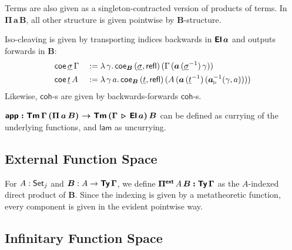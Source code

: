 \documentclass[sigplan,review,anonymous]{acmart}\settopmatter{printfolios=true,printccs=false,printacmref=false}
\newcommand{\ext}{\triangleright}
\newcommand{\Pii}{\Pi}
\newcommand{\appi}{\mathsf{app}}
\newcommand{\lami}{\mathsf{lam}}
\newcommand{\Pie}{\Pi^{\mathsf{ext}}}
\newcommand{\bTy}{\boldsymbol{\Ty}}
\newcommand{\bGamma}{\boldsymbol{\Gamma}}
\newcommand{\ba}{\boldsymbol{a}}
\newcommand{\bB}{\boldsymbol{B}}
\newcommand{\bEl}{\boldsymbol{\El}}
\newcommand{\bPii}{\boldsymbol{\Pi}}
\newcommand{\bPie}{\boldsymbol{\Pie}}
\newcommand{\ul}[1]{\underline{#1}}
\newcommand{\ulsigma}{\ul{\sigma}}
\newcommand{\ult}{\ul{t}}
\newcommand{\coe}{\mathsf{coe}}
\newcommand{\coh}{\mathsf{coh}}
\begin{document}
Terms are also given as a singleton-contracted version of products of terms. In
$\bPii\,\ba\,\bB$, all other structure is given pointwise by $\bB$-structure.

Iso-cleaving is given by transporting indices backwards in $\bEl\,\ba$ and outputs forwards
in $\bB$:
\begin{alignat*}{3}
  & \coe\,\ulsigma\,\Gamma &&:=
    \lambda\,\gamma.\,\coe_{\bB}\,(\ulsigma,\refl)\,(\Gamma\,(\ba\,(\ulsigma^{-1})\,\gamma))\\
  & \coe\,\ult\,A &&:=
    \lambda\,\gamma\,a.\,\coe_{\bB}\,(\ult,\refl)\,(A\,(\ba\,(\ult^{-1})\,(\ba_{\ext}^{-1}(\gamma,a))))
\end{alignat*}
Likewise, $\coh$-s are given by backwards-forwards $\coh$-s.

$\boldsymbol{\appi : \Tm\,\Gamma\,(\Pii\,a\,B)\ra
  \Tm\,(\Gamma\,\ext\,\El\,a)\,B}$ can be defined as currying of the underlying
functions, and $\boldsymbol{\lami}$ as uncurrying.


\subsection{External Function Space}

For $A : \mathsf{Set}_j$ and $\bB : A \ra \bTy\,\bGamma$, we define $\bPie\,A\,\bB
\boldsymbol{:} \bTy\,\bGamma$ as the $A$-indexed direct product of $\bB$. Since
the indexing is given by a metatheoretic function, every component is given in the
evident pointwise way.

\subsection{Infinitary Function Space}
\label{sec:infinitaryfunction}
\end{document}
